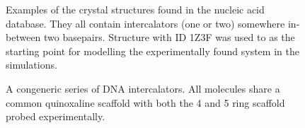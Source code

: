 \begin{figure}
  \caption{Examples of the crystal structures found in the nucleic acid database. They all contain intercalators (one or two) somewhere in-between two basepairs. Structure with ID 1Z3F was used to as the starting point for modelling the experimentally found system in the simulations.}
  \label{}
\end{figure}

\begin{figure}
	\centering
	
	
	\caption{A congeneric series of DNA intercalators. All molecules share a common quinoxaline scaffold with both the 4 and 5 ring scaffold probed experimentally.}
	\label{fig:intercalators}
\end{figure}


